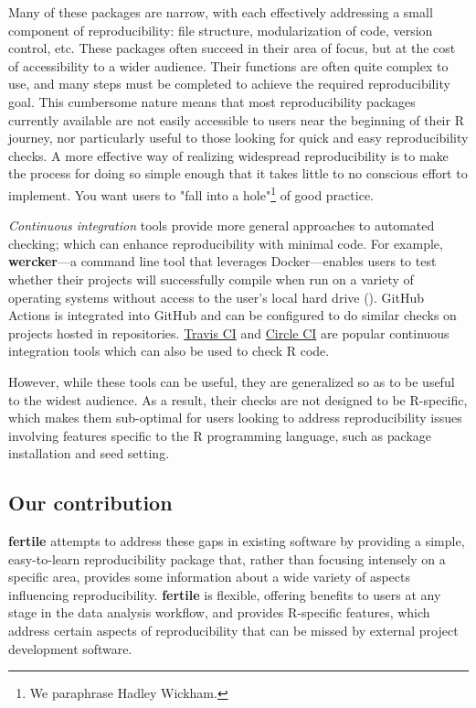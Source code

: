 \documentclass[APA,LATO1COL]{WileyNJD-v2}\usepackage[]{graphicx}\usepackage[]{color}
\newcommand{\R}{\textsf{R}\xspace}
\newcommand{\pkg}[1]{\textbf{#1}}
\begin{document}
Many of these packages are narrow, with each effectively addressing a small component of reproducibility: file structure, modularization of code, version control, etc. These packages often  succeed in their area of focus, but at the cost of accessibility to a wider audience. Their functions are often quite complex to use, and many steps must be completed to achieve the required reproducibility goal. This cumbersome nature means that most reproducibility packages currently available are not easily accessible to users near the beginning of their \R journey, nor particularly useful to those looking for quick and easy reproducibility checks.
A more effective way of realizing widespread reproducibility is to make the process for doing so simple enough that it takes little to no conscious effort to implement. You want users to "fall into a hole"\footnote{We paraphrase Hadley Wickham.} of good practice. 

\emph{Continuous integration} tools provide more general approaches to automated checking; which can enhance reproducibility with minimal code. For example, \pkg{wercker}---a command line tool that leverages Docker---enables users to test whether their projects will successfully compile when run on a variety of operating systems without access to the user's local hard drive (\cite{wercker}). GitHub Actions is integrated into GitHub and can be configured to do similar checks on projects hosted in repositories. \href{https://travis-ci.com}{Travis CI} and \href{https://circleci.com/product}{Circle CI} are popular continuous integration tools which can also be used to check \R code. 

However, while these tools can be useful, they are generalized so as to be useful to the widest audience. As a result, their checks are not designed to be \R-specific, which makes them sub-optimal for users looking to address reproducibility issues involving features specific to the \R programming language, such as package installation and seed setting.

\subsection{Our contribution}

\pkg{fertile} attempts to address these gaps in existing software by providing a simple, easy-to-learn reproducibility package that, rather than focusing intensely on a specific area, provides some information about a wide variety of aspects influencing reproducibility. \pkg{fertile} is flexible, offering benefits to users at any stage in the data analysis workflow, and provides \R-specific features, which address certain aspects of reproducibility that can be missed by external project development software.
\end{document}
